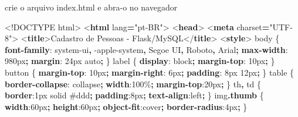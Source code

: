 \documentclass[
]{book}
\newenvironment{Shaded}{\begin{snugshade}}{\end{snugshade}}
\newcommand{\BuiltInTok}[1]{#1}
\newcommand{\CharTok}[1]{\textcolor[rgb]{0.31,0.60,0.02}{#1}}
\newcommand{\ConstantTok}[1]{\textcolor[rgb]{0.56,0.35,0.01}{#1}}
\newcommand{\DataTypeTok}[1]{\textcolor[rgb]{0.13,0.29,0.53}{#1}}
\newcommand{\DecValTok}[1]{\textcolor[rgb]{0.00,0.00,0.81}{#1}}
\newcommand{\FunctionTok}[1]{\textcolor[rgb]{0.13,0.29,0.53}{\textbf{#1}}}
\newcommand{\KeywordTok}[1]{\textcolor[rgb]{0.13,0.29,0.53}{\textbf{#1}}}
\newcommand{\NormalTok}[1]{#1}
\newcommand{\OperatorTok}[1]{\textcolor[rgb]{0.81,0.36,0.00}{\textbf{#1}}}
\newcommand{\OtherTok}[1]{\textcolor[rgb]{0.56,0.35,0.01}{#1}}
\newcommand{\StringTok}[1]{\textcolor[rgb]{0.31,0.60,0.02}{#1}}
\begin{document}
crie o arquivo index.html e abra-o no navegador

\begin{Shaded}
\begin{Highlighting}[]
\DataTypeTok{\textless{}!DOCTYPE}\NormalTok{ html}\DataTypeTok{\textgreater{}}
\DataTypeTok{\textless{}}\KeywordTok{html}\OtherTok{ lang}\OperatorTok{=}\StringTok{"pt{-}BR"}\DataTypeTok{\textgreater{}}
\DataTypeTok{\textless{}}\KeywordTok{head}\DataTypeTok{\textgreater{}}
\DataTypeTok{\textless{}}\KeywordTok{meta}\OtherTok{ charset}\OperatorTok{=}\StringTok{"UTF{-}8"}\DataTypeTok{\textgreater{}}
\DataTypeTok{\textless{}}\KeywordTok{title}\DataTypeTok{\textgreater{}}\NormalTok{Cadastro de Pessoas {-} Flask/MySQL}\DataTypeTok{\textless{}/}\KeywordTok{title}\DataTypeTok{\textgreater{}}
\DataTypeTok{\textless{}}\KeywordTok{style}\DataTypeTok{\textgreater{}}
\NormalTok{  body \{ }\KeywordTok{font{-}family}\CharTok{:} \DecValTok{system{-}ui}\OperatorTok{,} \DecValTok{{-}apple{-}system}\OperatorTok{,} \DecValTok{Segoe UI}\OperatorTok{,} \DecValTok{Roboto}\OperatorTok{,} \DecValTok{Arial}\OperatorTok{;} \KeywordTok{max{-}width}\CharTok{:} \DecValTok{980}\DataTypeTok{px}\OperatorTok{;} \KeywordTok{margin}\CharTok{:} \DecValTok{24}\DataTypeTok{px} \BuiltInTok{auto}\OperatorTok{;}\NormalTok{ \}}
\NormalTok{  label \{ }\KeywordTok{display}\CharTok{:} \DecValTok{block}\OperatorTok{;} \KeywordTok{margin{-}top}\CharTok{:} \DecValTok{10}\DataTypeTok{px}\OperatorTok{;}\NormalTok{ \}}
\NormalTok{  button \{ }\KeywordTok{margin{-}top}\CharTok{:} \DecValTok{10}\DataTypeTok{px}\OperatorTok{;} \KeywordTok{margin{-}right}\CharTok{:} \DecValTok{6}\DataTypeTok{px}\OperatorTok{;} \KeywordTok{padding}\CharTok{:} \DecValTok{8}\DataTypeTok{px} \DecValTok{12}\DataTypeTok{px}\OperatorTok{;}\NormalTok{ \}}
\NormalTok{  table \{ }\KeywordTok{border{-}collapse}\CharTok{:} \DecValTok{collapse}\OperatorTok{;} \KeywordTok{width}\CharTok{:}\DecValTok{100}\DataTypeTok{\%}\OperatorTok{;} \KeywordTok{margin{-}top}\CharTok{:}\DecValTok{20}\DataTypeTok{px}\OperatorTok{;}\NormalTok{ \}}
\NormalTok{  th}\OperatorTok{,}\NormalTok{ td \{ }\KeywordTok{border}\CharTok{:}\DecValTok{1}\DataTypeTok{px} \DecValTok{solid} \ConstantTok{\#ddd}\OperatorTok{;} \KeywordTok{padding}\CharTok{:}\DecValTok{8}\DataTypeTok{px}\OperatorTok{;} \KeywordTok{text{-}align}\CharTok{:}\DecValTok{left}\OperatorTok{;}\NormalTok{ \}}
\NormalTok{  img}\FunctionTok{.thumb}\NormalTok{ \{ }\KeywordTok{width}\CharTok{:}\DecValTok{60}\DataTypeTok{px}\OperatorTok{;} \KeywordTok{height}\CharTok{:}\DecValTok{60}\DataTypeTok{px}\OperatorTok{;} \KeywordTok{object{-}fit}\CharTok{:}\DecValTok{cover}\OperatorTok{;} \KeywordTok{border{-}radius}\CharTok{:}\DecValTok{4}\DataTypeTok{px}\OperatorTok{;}\NormalTok{ \}}

\end{Highlighting}
\end{Shaded}
\end{document}

